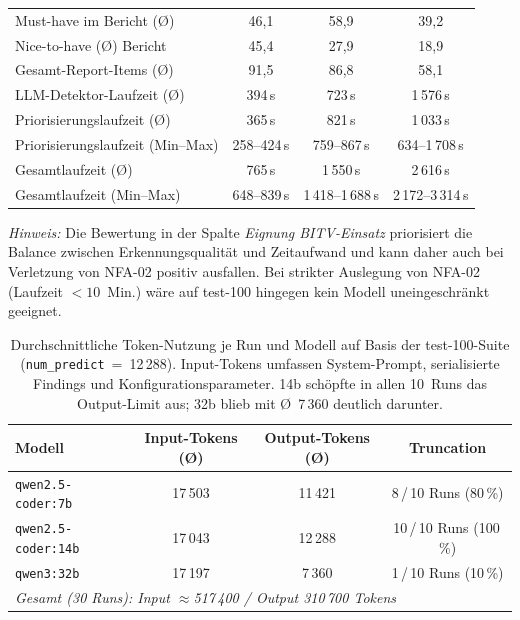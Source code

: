 \begin{table}[htbp]
{\begin{tabular}{|l|c|c|c|}
Must-have im Bericht (Ø)                     & 46{,}1           & 58{,}9             & 39{,}2 \\
Nice-to-have (Ø) Bericht                       & 45{,}4           & 27{,}9             & 18{,}9 \\
Gesamt-Report-Items (Ø)                        & 91{,}5           & 86{,}8             & 58{,}1 \\
\ac{LLM}-Detektor-Laufzeit (Ø)                      & 394\,s           & 723\,s              & 1\,576\,s \\
Priorisierungslaufzeit (Ø)                     & 365\,s           & 821\,s              & 1\,033\,s \\
Priorisierungslaufzeit (Min--Max)              & 258--424\,s      & 759--867\,s        & 634--1\,708\,s \\
Gesamtlaufzeit (Ø)                             & 765\,s           & 1\,550\,s           & 2\,616\,s \\
Gesamtlaufzeit (Min--Max)                      & 648--839\,s      & 1\,418--1\,688\,s   & 2\,172--3\,314\,s \\
\hline
\end{tabular}
}%
\label{tab:modell_summary_100}
\end{table}

\noindent\textit{Hinweis:} Die Bewertung in der Spalte \textit{Eignung \ac{BITV}-Einsatz} priorisiert die Balance zwischen Erkennungsqualität und Zeitaufwand und kann daher auch bei Verletzung von \ac{NFA}-02 positiv ausfallen. Bei strikter Auslegung von \ac{NFA}-02 (Laufzeit $<10$~Min.) wäre auf test-100 hingegen kein Modell uneingeschränkt geeignet.
 
\clearpage
 
\label{app:token_economy_100}
 
\begin{table}[htbp]
\centering
\setlength{\tabcolsep}{4pt}
\renewcommand{\arraystretch}{1.2}
\caption[Token-Nutzung pro Modell (test-100)]{Durchschnittliche Token-Nutzung je Run und Modell auf Basis der test-100-Suite (\texttt{num\_predict}~=~12\,288). Input-Tokens umfassen System-Prompt, serialisierte Findings und Konfigurationsparameter. 14b schöpfte in allen 10~Runs das Output-Limit aus; 32b blieb mit Ø~7\,360 deutlich darunter.}
\begin{tabular}{|l|c|c|c|}
\hline
\textbf{Modell} & \textbf{Input-Tokens (Ø)} & \textbf{Output-Tokens (Ø)} & \textbf{Truncation} \\
\hline
\texttt{qwen2.5-coder:7b} & 17\,503 & 11\,421 & 8\,/\,10 Runs (80\,\%) \\
\hline
\texttt{qwen2.5-coder:14b} & 17\,043 & 12\,288 & 10\,/\,10 Runs (100\,\%) \\
\hline
\texttt{qwen3:32b} & 17\,197 &  7\,360 &  1\,/\,10 Runs (10\,\%) \\
\hline
\multicolumn{4}{|l|}{\textit{Gesamt (30 Runs): Input $\approx$517\,400 / Output 310\,700 Tokens}} \\
\hline
\end{tabular}
\label{tab:token_economy_100}
\end{table}
 
